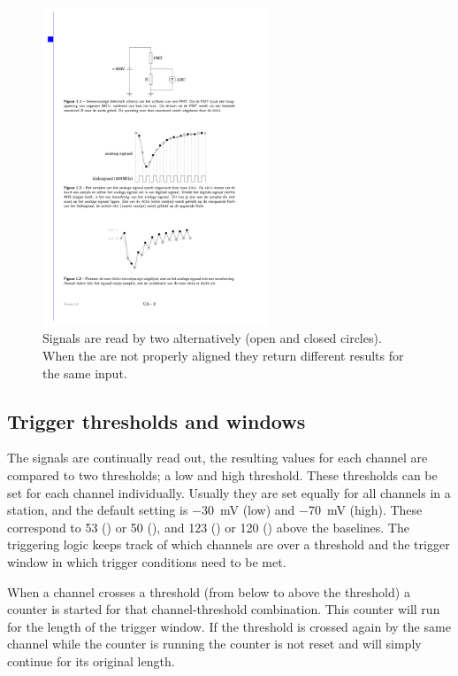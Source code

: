 \begin{figure}
    \centering
    \includegraphics[width=0.6\textwidth]
                    {plots/station/adc_alignment}
    \caption{Signals are read by two \adcs alternatively (open and closed circles). When the \adcs are not properly aligned they return different results for the same input.}
    \label{fig:adc_alignment}
\end{figure}


\subsection{Trigger thresholds and windows}

The \pmt signals are continually read out, the resulting \adc values for each channel are compared to two thresholds; a low and high threshold. These thresholds can be set for each channel individually. Usually they are set equally for all channels in a station, and the default setting is \SI{-30}{\milli\volt} (low) and \SI{-70}{\milli\volt} (high). These correspond to \SI{53}{\adc} (\hisparcii) or \SI{50}{\adc} (\hisparciii), and \SI{123}{\adc} (\hisparcii) or \SI{120}{\adc} (\hisparciii) above the baselines. The triggering logic keeps track of which channels are over a threshold and the trigger window in which trigger conditions need to be met.

When a channel crosses a threshold (from below to above the threshold) a counter is started for that channel-threshold combination. This counter will run for the length of the trigger window. If the threshold is crossed again by the same channel while the counter is running the counter is not reset and will simply continue for its original length.

